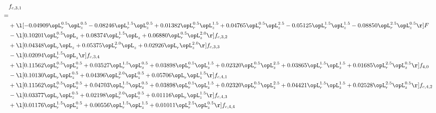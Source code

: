 \begin{alignat}{2} 
\label{eq:f_31_2} 
& f_{c,3,1} \nonumber \\ 
 = \\ 
& + \l[  -0.04909 \opL_r^{0.5} \opL_z^{0.5}   -0.08246 \opL_r^{1.5} \opL_z^{0.5} +  0.01382 \opL_r^{0.5} \opL_z^{1.5} +  0.04765 \opL_r^{0.5} \opL_z^{2.5}   -0.05125 \opL_r^{1.5} \opL_z^{1.5}   -0.08850 \opL_r^{2.5} \opL_z^{0.5}  \r] F \nonumber \\ 
& - \l[  0.10201 \opL_r^{0.5} \opL_z +  0.08374 \opL_r^{1.5} \opL_z +  0.06880 \opL_r^{0.5} \opL_z^{2.0}  \r] f_{c,3,2} \nonumber \\ 
& + \l[  0.04348 \opL_r \opL_z +  0.05375 \opL_r^{2.0} \opL_z +  0.02926 \opL_r \opL_z^{2.0}  \r] f_{c,3,3} \nonumber \\ 
& - \l[  0.02094 \opL_r^{1.5} \opL_z  \r] f_{c,3,4} \nonumber \\ 
& + \l[  0.11562 \opL_r^{0.5} \opL_z^{0.5} +  0.03527 \opL_r^{1.5} \opL_z^{0.5} +  0.03898 \opL_r^{0.5} \opL_z^{1.5} +  0.02320 \opL_r^{0.5} \opL_z^{2.5} +  0.03865 \opL_r^{1.5} \opL_z^{1.5} +  0.01685 \opL_r^{2.5} \opL_z^{0.5}  \r] f_{4,0} \nonumber \\ 
& - \l[  0.10130 \opL_r \opL_z^{0.5} +  0.04396 \opL_r^{2.0} \opL_z^{0.5} +  0.05706 \opL_r \opL_z^{1.5}  \r] f_{c,4,1} \nonumber \\ 
& + \l[  0.11562 \opL_r^{0.5} \opL_z^{0.5} +  0.04703 \opL_r^{1.5} \opL_z^{0.5} +  0.03898 \opL_r^{0.5} \opL_z^{1.5} +  0.02320 \opL_r^{0.5} \opL_z^{2.5} +  0.04421 \opL_r^{1.5} \opL_z^{1.5} +  0.02528 \opL_r^{2.5} \opL_z^{0.5}  \r] f_{c,4,2} \nonumber \\ 
& - \l[  0.03377 \opL_r \opL_z^{0.5} +  0.02198 \opL_r^{2.0} \opL_z^{0.5} +  0.01116 \opL_r \opL_z^{1.5}  \r] f_{c,4,3} \nonumber \\ 
& + \l[  0.01176 \opL_r^{1.5} \opL_z^{0.5} +  0.00556 \opL_r^{1.5} \opL_z^{1.5} +  0.01011 \opL_r^{2.5} \opL_z^{0.5}  \r] f_{c,4,4} \nonumber \\ 
\end{alignat} 


